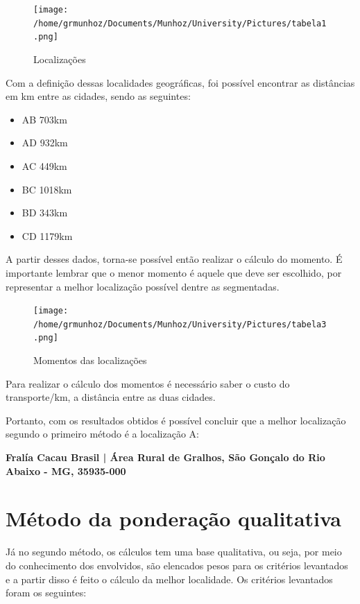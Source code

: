 \documentclass[
	12pt,				%
	openright,			%
	oneside,			%
	a4paper,			%
	english,			%
	french,				%
	spanish,			%
	brazil				%
	]{abntex2}
\begin{document}
\begin{figure}[H]
\begin{center}
\caption{Localizações}
\texttt{[image: /home/grmunhoz/Documents/Munhoz/University/Pictures/tabela1.png]} 
\label{loca}
\end{center}
\end{figure}

Com a definição dessas localidades geográficas, foi possível encontrar as distâncias em km entre as cidades, sendo as seguintes:

\begin{itemize}
\item AB 703km  
\item AD 932km
\item AC 449km
\item BC 1018km
\item BD 343km
\item CD 1179km
\end{itemize}

A partir desses dados, torna-se possível então realizar o cálculo do momento. É importante lembrar que o menor momento é aquele que deve ser escolhido, por representar a melhor localização possível dentre as segmentadas.

\begin{figure}[H]
\begin{center}
\caption{Momentos das localizações}
\texttt{[image: /home/grmunhoz/Documents/Munhoz/University/Pictures/tabela3.png]} 
\label{loca}
\end{center}
\end{figure}

Para realizar o cálculo dos momentos é necessário saber o custo do transporte/km, a distância entre as duas cidades.
	
Portanto, com os resultados obtidos é possível concluir que a melhor localização segundo o primeiro método é a localização A: 

\begin{center}
\textbf{Fralía Cacau Brasil | Área Rural de Gralhos, São Gonçalo do Rio Abaixo - MG, 35935-000}
\end{center}

\section{Método da ponderação qualitativa}

Já no segundo método, os cálculos tem uma base qualitativa, ou seja, por meio do conhecimento dos envolvidos, são elencados pesos para os critérios levantados e a partir disso é feito o cálculo da melhor localidade. Os critérios levantados foram os seguintes:
\end{document}
